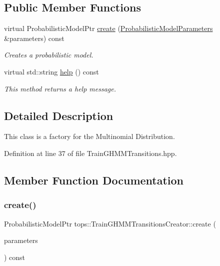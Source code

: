 \subsection*{Public Member Functions}
\begin{DoxyCompactItemize}
\item 
virtual Probabilistic\+Model\+Ptr \hyperlink{classtops_1_1TrainGHMMTransitionsCreator_a83d716ee938b4ccbc76b110d4b6b7ae9}{create} (\hyperlink{classtops_1_1ProbabilisticModelParameters}{Probabilistic\+Model\+Parameters} \&parameters) const
\begin{DoxyCompactList}\small\item\em Creates a probabilistic model. \end{DoxyCompactList}\item 
\mbox{\label{classtops_1_1TrainGHMMTransitionsCreator_a39ecdb6afba99b304dc4c4603e310f67}} 
virtual std\+::string \hyperlink{classtops_1_1TrainGHMMTransitionsCreator_a39ecdb6afba99b304dc4c4603e310f67}{help} () const
\begin{DoxyCompactList}\small\item\em This method returns a help message. \end{DoxyCompactList}\end{DoxyCompactItemize}


\subsection{Detailed Description}
This class is a factory for the Multinomial Distribution. 

Definition at line 37 of file Train\+G\+H\+M\+M\+Transitions.\+hpp.



\subsection{Member Function Documentation}
\mbox{\label{classtops_1_1TrainGHMMTransitionsCreator_a83d716ee938b4ccbc76b110d4b6b7ae9}} 
\subsubsection{\texorpdfstring{create()}{create()}}
{\footnotesize\ttfamily Probabilistic\+Model\+Ptr tops\+::\+Train\+G\+H\+M\+M\+Transitions\+Creator\+::create (\begin{DoxyParamCaption}\item[{\hyperlink{classtops_1_1ProbabilisticModelParameters}{Probabilistic\+Model\+Parameters} \&}]{parameters }\end{DoxyParamCaption}) const\hspace{0.3cm}{\ttfamily [virtual]}}




